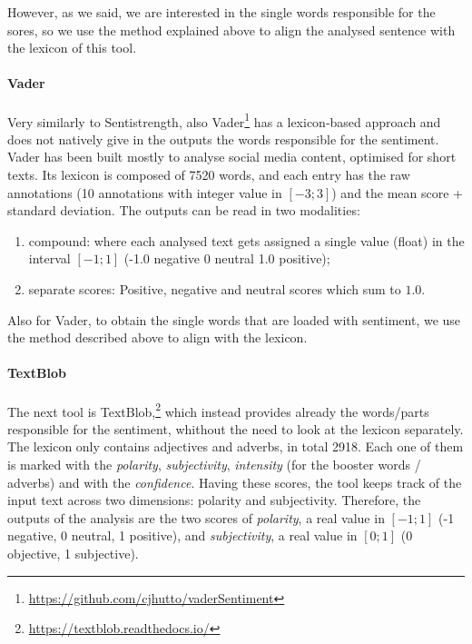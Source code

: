 However, as we said, we are interested in the single words responsible for the sores, so we use the method explained above to align the analysed sentence with the lexicon of this tool.

\paragraph{Vader}
Very similarly to Sentistrength, also Vader\footnote{\url{https://github.com/cjhutto/vaderSentiment}} has a lexicon-based approach and does not natively give in the outputs the words responsible for the sentiment. Vader has been built mostly to analyse social media content, optimised for short texts.
Its lexicon is composed of 7520 words, and each entry has the raw annotations (10 annotations with integer value in $[-3;3]$) and the mean score + standard deviation.
The outputs can be read in two modalities:
\begin{enumerate}
    \item compound: where each analysed text gets assigned a single value (float) in the interval $[-1;1]$ (-1.0 negative 0 neutral 1.0 positive);
    \item separate scores: Positive, negative and neutral scores which sum to $1.0$.
\end{enumerate}

Also for Vader, to obtain the single words that are loaded with sentiment, we use the method described above to align with the lexicon.



\paragraph{TextBlob}
The next tool is TextBlob,\footnote{\url{ https://textblob.readthedocs.io/}} which instead provides already the words/parts responsible for the sentiment, whithout the need to look at the lexicon separately.
The lexicon only contains adjectives and adverbs, in total 2918. Each one of them is marked with the \emph{polarity}, \emph{subjectivity}, \emph{intensity} (for the booster words / adverbs) %
and with the \emph{confidence}. Having these scores, the tool keeps track of the input text across two dimensions: polarity and subjectivity.
Therefore, the outputs of the analysis are the two scores of \emph{polarity}, a real value in $[-1;1]$ (-1 negative, 0 neutral, 1 positive), and \emph{subjectivity}, a real value in $[0;1]$ (0 objective, 1 subjective).

